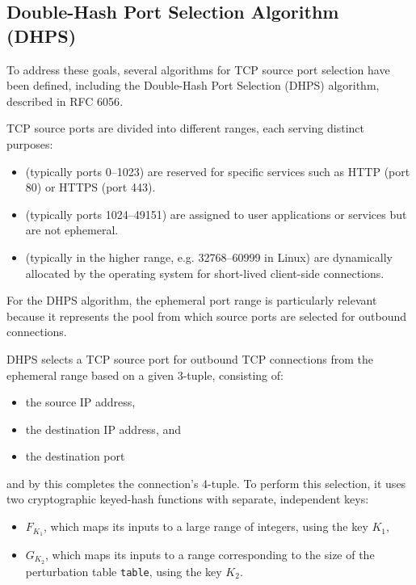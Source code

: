 \documentclass{report}
\begin{document}
\subsection{Double-Hash Port Selection Algorithm (DHPS)}
\label{sec:double-hash port selection algorithm}

To address these goals, several algorithms for TCP source port selection have been defined, including the \alert{Double-Hash Port Selection (DHPS)} algorithm, described in RFC 6056\cite{larsenRecommendationsTransportProtocolPort2011}.

TCP source ports are divided into different ranges, each serving distinct purposes:
\begin{itemize}
	\item {} (typically ports 0–1023) are reserved for specific services such as HTTP (port 80) or HTTPS (port 443).
	\item {} (typically ports 1024–49151) are assigned to user applications or services but are not ephemeral.
	\item {} (typically in the higher range, e.g. 32768–60999 in Linux) are dynamically allocated by the operating system for short-lived client-side connections.
\end{itemize}

For the DHPS algorithm, the \alert{ephemeral port} range is particularly relevant because it represents the pool from which source ports are selected for outbound connections.

DHPS selects a TCP \alert{source port} for outbound TCP connections from the ephemeral range based on a given \alert{3-tuple}, consisting of:
\begin{itemize}
	\item the \alert{source IP} address,
	\item the \alert{destination IP} address, and
	\item the \alert{destination port}
\end{itemize}
and by this completes the connection’s \alert{4-tuple}. To perform this selection, it uses two \alert{cryptographic keyed-hash functions} with separate, independent keys:
\begin{itemize}
	\item \( F_{K_1} \), which maps its inputs to a large range of integers, using the key \( K_1 \),
	\item \( G_{K_2} \), which maps its inputs to a range corresponding to the size of the \alert{perturbation table} \texttt{table}, using the key \( K_2 \).
\end{itemize}
\end{document}
